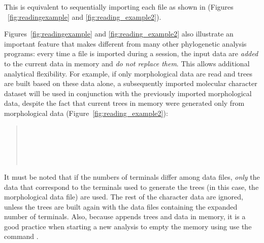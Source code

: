 {This is equivalent to sequentially importing each file as shown in (Figures ~\ref{fig:readingexample} and \ref{fig:reading_example2}).

Figures~\ref{fig:readingexample} and \ref{fig:reading_example2} also illustrate an important feature that makes \poy 
different from many other phylogenetic analysis programs: every time a file is imported during a \poy session, the input 
data are \emph{added} to the current data in memory and \emph{do not replace them}. This allows additional analytical 
flexibility. For example, if only morphological data are read and trees are built based on these data alone, a subsequently 
imported molecular character dataset will be used in conjunction with the previously imported morphological data, despite 
the fact that current trees in memory were generated only from morphological data (Figure~\ref{fig:reading_example2}):

\begin{quote}
\\
\\
\\
\\
\end{quote}

It must be noted that if the numbers of terminals differ among data files, \emph{only} the data that correspond to the 
terminals used to generate the trees (in this case, the morphological data file) are used. The rest of the character data are 
ignored, unless the trees are built again with the data files containing the expanded number of terminals.  Also, 
because \poy appends trees and data in memory, it is a good practice when starting a new analysis to empty the 
memory using use the command .

}
